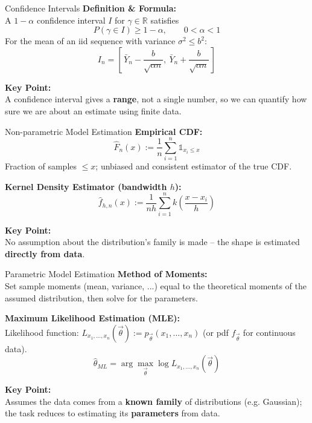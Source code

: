 \documentclass{beamer}
\begin{document}
\begin{frame}{Confidence Intervals}
\textbf{Definition \& Formula:}\\[0.5mm]
A $1-\alpha$ confidence interval $I$ for $\gamma \in \mathbb{R}$ satisfies
\[
P(\gamma \in I) \ge 1-\alpha, \qquad 0<\alpha<1
\]
For the mean of an iid sequence with variance $\sigma^2 \le b^2$:
\[
I_n = \left[\, \bar{Y}_n - \frac{b}{\sqrt{\alpha n}},\ \bar{Y}_n + \frac{b}{\sqrt{\alpha n}} \,\right]
\]

\vspace{1.5mm}
\textbf{Key Point:}\\[0.5mm]
A confidence interval gives a \textbf{range}, not a single number, so we can quantify how sure we are about an estimate using finite data.
\vspace{1.5mm}
\end{frame}

\begin{frame}{Non-parametric Model Estimation}
\textbf{Empirical CDF:}\\[0.5mm]
\[
\hat{F}_n(x) := \frac{1}{n}\sum_{i=1}^{n} \mathbb{1}_{x_i \le x}
\]
Fraction of samples $\le x$; unbiased and consistent estimator of the true CDF.

\vspace{1.5mm}
\textbf{Kernel Density Estimator (bandwidth $h$):}\\[0.5mm]
\[
\hat{f}_{h,n}(x) := \frac{1}{nh}\sum_{i=1}^{n} k\!\left(\frac{x-x_i}{h}\right)
\]

\vspace{1.5mm}
\textbf{Key Point:}\\[0.5mm]
No assumption about the distribution's family is made -- the shape is estimated \textbf{directly from data}.
\vspace{1.5mm}
\end{frame}

\begin{frame}{Parametric Model Estimation}
\textbf{Method of Moments:}\\[0.5mm]
Set sample moments (mean, variance, ...) equal to the theoretical moments of the assumed distribution, then solve for the parameters.

\vspace{1.5mm}
\textbf{Maximum Likelihood Estimation (MLE):}\\[0.5mm]
Likelihood function: $L_{x_1,\dots,x_n}(\vec\theta) := p_{\vec\theta}(x_1,\dots,x_n)$ (or pdf $f_{\vec\theta}$ for continuous data). \\
\[
\hat{\theta}_{ML} = \arg\max_{\vec\theta} \log L_{x_1,\dots,x_n}(\vec\theta)
\]

\vspace{1.5mm}
\textbf{Key Point:}\\[0.5mm]
Assumes the data comes from a \textbf{known family} of distributions (e.g. Gaussian); the task reduces to estimating its \textbf{parameters} from data.
\vspace{1.5mm}
\end{frame}
\end{document}

